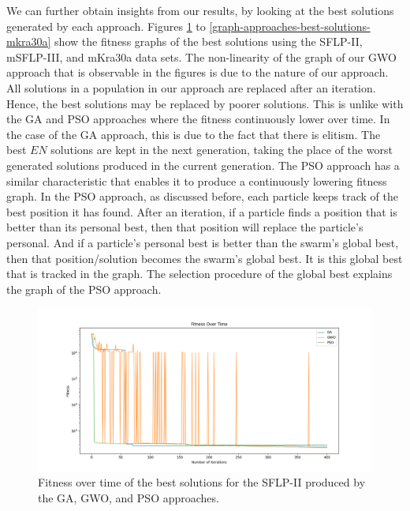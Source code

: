 We can further obtain insights from our results, by looking at the best solutions generated by each approach. Figures \ref{graph-approaches-best-solutions-sflp-ii} to \ref{graph-approaches-best-solutions-mkra30a} show the fitness graphs of the best solutions using the SFLP-II, mSFLP-III, and mKra30a data sets. The non-linearity of the graph of our GWO approach that is observable in the figures is due to the nature of our approach. All solutions in a population in our approach are replaced after an iteration. Hence, the best solutions may be replaced by poorer solutions. This is unlike with the GA and PSO approaches where  the fitness continuously lower over time. In the case of the GA approach, this is due to the fact that there is elitism. The best $EN$ solutions are kept in the next generation, taking the place of the worst generated solutions produced in the current generation. The PSO approach has a similar characteristic that enables it to produce a continuously lowering fitness graph. In the PSO approach, as discussed before, each particle keeps track of the best position it has found. After an iteration, if a particle finds a position that is better than its personal best, then that position will replace the particle's personal. And if a particle's personal best is better than the swarm's global best, then that position/solution becomes the swarm's global best. It is this global best that is tracked in the graph. The selection procedure of the global best explains the graph of the PSO approach.

\begin{figure}[h!]
\centering
\begin{adjustwidth}{-0.45in}{}
\includegraphics[scale=0.5]{./images/chap07-rd/best-fitness-over-time-sflp2.png}
\end{adjustwidth}
\caption{Fitness over time of the best solutions for the SFLP-II produced by the GA, GWO, and PSO approaches.}
\label{graph-approaches-best-solutions-sflp-ii}
\end{figure}

